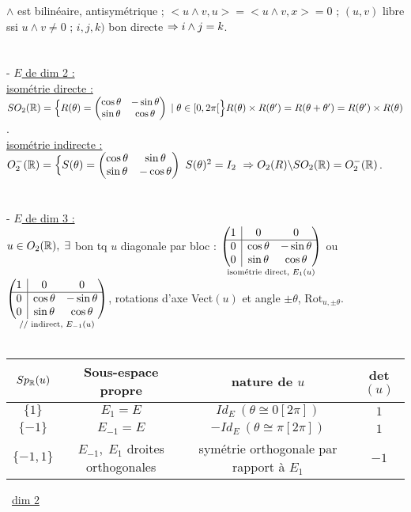 \documentclass[12 pt]{exampleclass}
\begin{document}
$\land$ est bilinéaire, antisymétrique ; $<u\land v,u> = <u\land v,x>=0$ ; $(u,v)$ libre ssi $u\land v \neq 0$ ; $i,j,k)$ bon directe $\Rightarrow i\land j =k$.\\
\text{}\\
\text{}\\
- \underline{$E$ de dim 2 :}\\
\underline{isométrie directe :} $SO_2(\mathbb{R}) = \Big\{ R(\theta) = \begin{pmatrix} \cos \theta & -\sin \theta \\
\sin \theta & \cos \theta\end{pmatrix} \; | \; \theta\in [0,2\pi[ \Big\} \\ R(\theta)\times R(\theta') = R(\theta + \theta') = R(\theta')\times R(\theta)$.\\
\underline{isométrie indirecte :} $ O_2^-(\mathbb{R}) = \Big\{ S(\theta) = \begin{pmatrix} \cos \theta & \sin \theta \\
\sin \theta & -\cos \theta\end{pmatrix} \ S(\theta)^2 = I_2 \ \Rightarrow O_2(R)\backslash SO_2(\mathbb{R}) = O_2^-(\mathbb{R})$.\\
\text{}\\
\text{}\\
- \underline{$E$ de dim 3 :}\\
$u\in O_2(\mathbb{R}), \; \exists$ bon tq $u$ diagonale par bloc : $\underset{\text{isométrie direct, } E_1(u)}{\begin{pmatrix} 1 &\rvline & 0 & 0\\\hline 0 &\rvline& \cos \theta & -\sin \theta \\ 0 &\rvline &\sin \theta & \cos \theta\end{pmatrix}}$ ou $\underset{\text{// indirect, }E_{-1}(u)}{\begin{pmatrix} 1 &\rvline & 0 & 0\\\hline 0 &\rvline& \cos \theta & -\sin \theta \\ 0 &\rvline &\sin \theta & \cos \theta\end{pmatrix}}$, rotations d'axe Vect$(u)$ et angle $\pm\theta$, $\text{Rot}_{u, \pm\theta}$.\\
\text{}\\
\begin{tabular}{|c|c|c|c|}
\hline
     $Sp_{\mathbb{R}}(u)$ & Sous-espace propre & nature de $u$ & det$(u)$ \\\hline
     $\{1\}$ & $E_1 =E$ & $Id_E \ (\theta \cong 0[2\pi])$ & $1$\\\hline
     $\{-1\}$ & $E_{-1}=E$ & $-Id_E \ (\theta \cong \pi[2\pi])$ & $1$\\\hline
     $\{-1,1\}$ & $E_{-1}, \; E_1$ droites orthogonales & symétrie orthogonale par rapport à $E_1$ & $-1$\\\hline
\end{tabular} \ \underline{dim 2}\\
\end{document}
